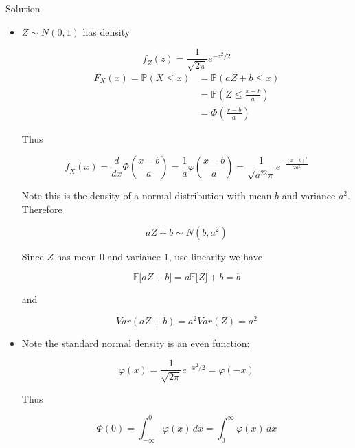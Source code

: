 \begin{qlsolution}{Solution}

\begin{itemize}
\item
  \(\mathit{Z} \sim \mathit{N}(0,1)\) has density

  \[\mathit{f}_{\mathit{Z}}(\mathit{z}) = \frac{1}{\sqrt{2\mathit{\pi}}}\mathit{e}^{- \mathit{z}^{2}/2}\]\[\begin{matrix}
  {\mathit{F}_{\mathit{X}}(\mathit{x}) = \mathbb{P}(\mathit{X} \leq \mathit{x})} & {= \mathbb{P}(\mathit{a}\mathit{Z} + \mathit{b} \leq \mathit{x})} \\
   & {= \mathbb{P}\left( {\mathit{Z} \leq \frac{\mathit{x} - \mathit{b}}{\mathit{a}}} \right)} \\
   & {= \Phi\left( \frac{\mathit{x} - \mathit{b}}{\mathit{a}} \right)}
  \end{matrix}\]

  Thus

  \[\mathit{f}_{\mathit{X}}(\mathit{x}) = \frac{\mathit{d}}{\mathit{d}\mathit{x}}\Phi\left( \frac{\mathit{x} - \mathit{b}}{\mathit{a}} \right) = \frac{1}{\mathit{a}}\mathit{\varphi}\left( \frac{\mathit{x} - \mathit{b}}{\mathit{a}} \right) = \frac{1}{\sqrt{\mathit{a}^{22}\mathit{\pi}}}\mathit{e}^{- \frac{(\mathit{x} - \mathit{b})^{2}}{2\mathit{a}^{2}}}\]

  Note this is the density of a normal distribution with mean \(\mathit{b}\) and variance \(\mathit{a}^{2}\). Therefore

  \[\mathit{a}\mathit{Z} + \mathit{b} \sim \mathit{N}(\mathit{b},\mathit{a}^{2})\]

  Since \(\mathit{Z}\) has mean \(0\) and variance \(1\), use linearity we have

  \[\mathbb{E}\lbrack\mathit{a}\mathit{Z} + \mathit{b}\rbrack = \mathit{a}\mathbb{E}\lbrack\mathit{Z}\rbrack + \mathit{b} = \mathit{b}\]

  and

  \[Var(\mathit{a}\mathit{Z} + \mathit{b}) = \mathit{a}^{2}Var(\mathit{Z}) = \mathit{a}^{2}\]
\item
  Note the standard normal density is an even function:

  \[\mathit{\varphi}(\mathit{x}) = \frac{1}{\sqrt{2\mathit{\pi}}}\mathit{e}^{- \mathit{x}^{2}/2} = \mathit{\varphi}( - \mathit{x})\]

  Thus

  \[\Phi(0) = \int_{- \infty}^{0}\mathit{\varphi}(\mathit{x})\,\mathit{d}\mathit{x} = \int_{0}^{\infty}\mathit{\varphi}(\mathit{x})\,\mathit{d}\mathit{x}\]


\end{itemize}
\end{qlsolution}
